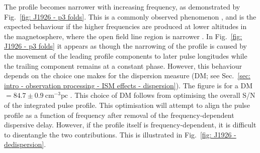 The profile becomes narrower with increasing frequency, as demonstrated by Fig.~\ref{fig: J1926 - p3 folds}. This is a commonly observed phenomenon \citep[e.g.][]{CWxx2014,PHS+2016}, and is the expected behaviour if the higher frequencies are produced at lower altitudes in the magnetosphere, where the open field line region is narrower \citep[e.g.][]{RSxx1975,KGxx2003}. In Fig.~\ref{fig: J1926 - p3 folds} it appears as though the narrowing of the profile is caused by the movement of the leading profile components to later pulse longitudes while the trailing component remains at a constant phase. However, this behaviour depends on the choice one makes for the dispersion measure (DM; see Sec.~\ref{sec: intro - observation processing - ISM effects - dispersion}). The figure is for a DM$= 84.7 \pm 0.9\ \mathrm{cm}^{-3}\mathrm{pc}$ \citep{ZLH+2019}. This choice of DM follows from optimising the overall S/N of the integrated pulse profile. This optimisation will attempt to align the pulse profile as a function of frequency after removal of the frequency-dependent dispersive delay. However, if the profile itself is frequency-dependent, it is difficult to disentangle the two contributions. This is illustrated in Fig.~\ref{fig: J1926 - dedispersion}.
